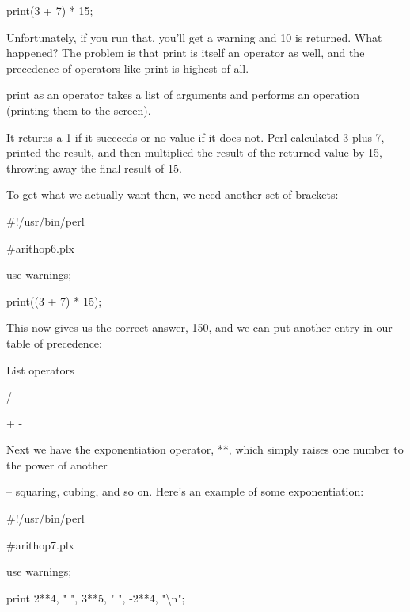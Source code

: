 \documentclass[a4paper,11pt]{book}
\begin{document}
\noindent print(3 + 7) * 15;

\noindent 

\noindent Unfortunately, if you run that, you'll get a warning and 10 is returned. What happened? The problem is that print is itself an operator as well, and the precedence of operators like print is highest of all.

\noindent 

\noindent print as an operator takes a list of arguments and performs an operation (printing them to the screen).

\noindent It returns a 1 if it succeeds or no value if it does not. Perl calculated 3 plus 7, printed the result, and then multiplied the result of the returned value by 15, throwing away the final result of 15.

\noindent 

\noindent To get what we actually want then, we need another set of brackets:

\noindent 

\noindent \#!/usr/bin/perl

\noindent \#arithop6.plx

\noindent use warnings;

\noindent print((3 + 7) * 15);

\noindent 

\noindent This now gives us the correct answer, 150, and we can put another entry in our table of precedence:

\noindent 

\noindent List operators

\noindent 

\noindent * /

\noindent 

\noindent + -

\noindent 

\noindent 

\noindent Next we have the exponentiation operator, **, which simply raises one number to the power of another

\noindent -- squaring, cubing, and so on. Here's an example of some exponentiation:

\noindent 

\noindent 

\noindent \#!/usr/bin/perl

\noindent \#arithop7.plx

\noindent use warnings;

\noindent print 2**4, " ", 3**5, " ", -2**4, "\textbackslash n";
\end{document}
